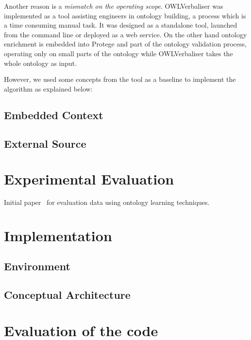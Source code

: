 \documentclass[draft,final]{vutinfth} %
\begin{document}
Another reason is a \emph{mismatch on the operating scope}. OWLVerbaliser was implemented as a tool assisting engineers in ontology building, a process which is a time consuming manual task. It was designed as a standalone tool, launched from the command line or deployed as a web service. On the other hand ontology enrichment is embedded into Protege and part of the ontology validation process, operating only on small parts of the ontology while OWLVerbaliser takes the whole ontology as input. 


However, we used some concepts from the tool as a baseline to implement the algorithm as explained below:

\section{Embedded Context}\label{sec:embedded_context}
\section{External Source}\label{sec:external_source}


\chapter{Experimental Evaluation}
Initial paper~\cite{liu2005semi} for evaluation data using ontology learning techniques.


\chapter{Implementation}\label{chap:implementation}
\section{Environment}
\section{Conceptual Architecture}




\chapter{Evaluation of the code}
\end{document}
